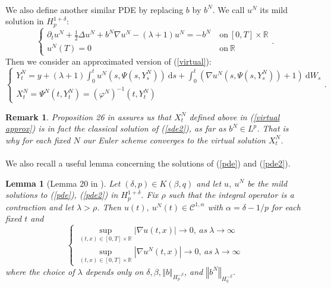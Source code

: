 \documentclass[12pt]{article}
\newtheorem{lem}[theo]{Lemma}
\newtheorem{rem}{Remark}
\newcommand{\norme}[1]{\left\Vert #1\right\Vert}
\newcommand{\R}{\mathbb{R}}
\newcommand{\di}{\mathrm{d}}
\begin{document}
        \paragraph{}
        We also define another similar PDE by replacing $b$ by $b^N$. We call $u^N$ its mild solution in $H_p^{1+\delta}$:
        \begin{equation}\label{pde2}
        \begin{cases}
        \partial_t u^N + \frac{1}{2}\Delta u^N + b^N\nabla u^N - (\lambda+1)u^N = -b^N\ &\mathrm{on}\ [0,T]\times\R\\
        u^N(T) = 0\ &\mathrm{on}\ \R
        \end{cases}.
        \end{equation}
        Then we consider an approximated version of (\ref{virtual}): \begin{equation}\label{virtual approx}
        \begin{cases}
        Y_t^N = y + (\lambda+1)\int_0^t u^N\left(s,\Psi\left(s,Y_s^N\right)\right)\ \di s +\int_0^t \left(\nabla u^N\left(s,\Psi\left(s,Y_s^N\right)\right)+1\right)\ \di W_s\\
        X_t^N = \Psi^N(t,Y_t^N) = {(\varphi^N)}^{-1}(t,Y_t^N)
        \end{cases}.
        \end{equation}
        
        \begin{rem}
            Proposition 26 in \cite{Fla-Iss-Rus-2017} assures us that $X^N_t$ defined above in (\ref{virtual approx}) is in fact the classical solution of (\ref{sde2}), as far as $b^N\in L^p$. That is why for each fixed $N$ our Euler scheme converges to the virtual solution $X^N_t$.
        \end{rem}
    
    \paragraph{}              
    We also recall a useful lemma concerning the solutions of (\ref{pde}) and (\ref{pde2}).
    
    \begin{lem}[Lemma 20 in \cite{Fla-Iss-Rus-2017}]\label{lem}
        Let $(\delta,p)\in K(\beta,q)$ and let $u,\ u^N$ be the mild solutions to (\ref{pde}), (\ref{pde2}) in $H_p^{1+\delta}$. Fix $\rho$ such that the integral operator is a contraction and let $\lambda>\rho$. Then $u(t),\ u^N(t)\in\mathcal{C}^{1,\alpha}$ with $\alpha=\delta-1/p$ for each fixed $t$ and 
        \begin{equation*}
        \begin{cases}
        \underset{(t,x)\in[0,T]\times\R}{\sup} |\nabla u(t,x)| \rightarrow 0,\ as\ \lambda \rightarrow \infty \\
        \underset{(t,x)\in[0,T]\times\R}{\sup} |\nabla u^N(t,x)| \rightarrow 0,\ as\ \lambda \rightarrow \infty
        \end{cases}
        \end{equation*}
        where the choice of $\lambda$ depends only on $\delta,\beta,\norme{b}_{H_p^{-\beta}}$, and $\norme{b^N}_{H_q^{-\beta}}$.
    \end{lem}
    
\end{document}
